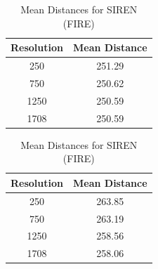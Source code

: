 \begin{table}[h]
    \centering
    \begin{minipage}[t]{0.45\linewidth}
        \centering
        \begin{tabular}{|c|c|}
        \hline
        Resolution & Mean Distance \\ \hline
        250 & 251.29 \\ \hline
        750 & 250.62 \\ \hline
        1250 & 250.59 \\ \hline
        1708 & 250.59 \\ \hline
        \end{tabular}
        \caption{Mean Distances for MLP (FIRE)}
        \label{tab:mlp_mean_distances_fire}
    \end{minipage}
    \hfill
    \begin{minipage}[t]{0.45\linewidth}
        \centering
        \begin{tabular}{|c|c|}
        \hline
        Resolution & Mean Distance \\ \hline
        250 & 263.85 \\ \hline
        750 & 263.19 \\ \hline
        1250 & 258.56 \\ \hline
        1708 & 258.06 \\ \hline
        \end{tabular}
        \caption{Mean Distances for SIREN (FIRE)}
        \label{tab:siren_mean_distances_fire}
    \end{minipage}
\end{table}

